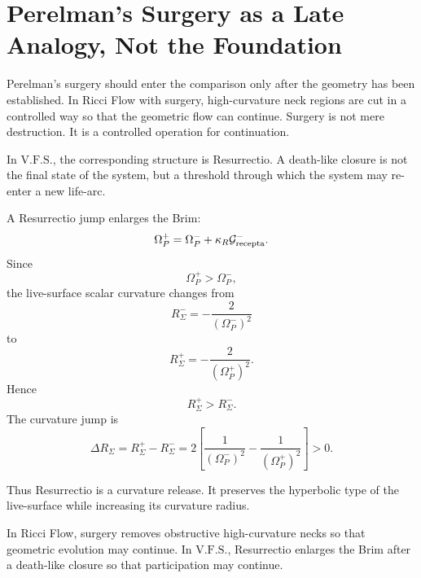 \documentclass[11pt]{article}
\newcommand{\VFS}{\ensuremath{\mathrm{V.F.S.}}}
\newcommand{\Grec}{\mathcal G_{\rm recepta}}
\begin{document}
\section{Perelman's Surgery as a Late Analogy, Not the Foundation}

Perelman's surgery should enter the comparison only after the geometry has been established. In Ricci Flow with surgery, high-curvature neck regions are cut in a controlled way so that the geometric flow can continue. Surgery is not mere destruction. It is a controlled operation for continuation.

In \VFS{}, the corresponding structure is Resurrectio. A death-like closure is not the final state of the system, but a threshold through which the system may re-enter a new life-arc.

A Resurrectio jump enlarges the Brim:
\[
 \Omega_P^+
 =
 \Omega_P^-
 +
 \kappa_R\Grec^-.
\]
Since
\[
 \Omega_P^+>\Omega_P^-,
\]
the live-surface scalar curvature changes from
\[
 R_{\Sigma}^-=-\frac{2}{(\Omega_P^-)^2}
\]
to
\[
 R_{\Sigma}^+=-\frac{2}{(\Omega_P^+)^2}.
\]
Hence
\[
 R_{\Sigma}^+>R_{\Sigma}^-.
\]
The curvature jump is
\[
 \Delta R_{\Sigma}
 =
 R_{\Sigma}^+-R_{\Sigma}^-
 =
 2\left[
 \frac{1}{(\Omega_P^-)^2}
 -
 \frac{1}{(\Omega_P^+)^2}
 \right]
 >0.
\]

Thus Resurrectio is a curvature release. It preserves the hyperbolic type of the live-surface while increasing its curvature radius.

In Ricci Flow, surgery removes obstructive high-curvature necks so that geometric evolution may continue. In \VFS{}, Resurrectio enlarges the Brim after a death-like closure so that participation may continue.
\end{document}
